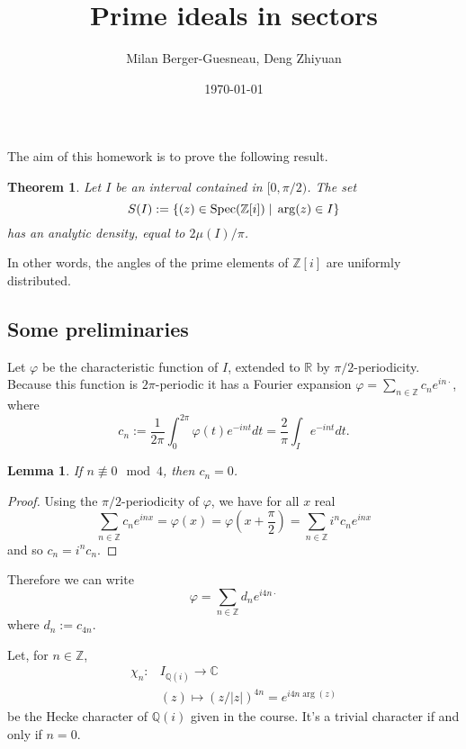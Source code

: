 \documentclass[12pt,a4paper,english]{article}
\title{Prime ideals in sectors}
\date{\today}
\author{Milan Berger-Guesneau, Deng Zhiyuan}
\theoremstyle{plain}
\newtheorem*{thm}{Theorem}
\newtheorem*{lem}{Lemma}
\theoremstyle{definition}
\DeclareMathOperator{\Spec}{\normalfont{Spec}}
\begin{document}
\maketitle

The aim of this homework is to prove the following result.

\begin{thm}
Let $I$ be an interval contained in $[0,\pi/2)$. The set
\begin{equation*}
    S(I):=\{(z)\in\Spec(\mathbb{Z}[i])\mid\, \arg(z)\in I\}
\end{equation*}
has an analytic density, equal to $2\mu(I)/\pi$.
\end{thm}
In other words, the angles of the prime elements of $\mathbb{Z}[i]$ are uniformly distributed.

\vspace{0.5cm}

\subsection*{Some preliminaries}

Let $\varphi$ be the characteristic function of $I$, extended to $\mathbb{R}$ by $\pi/2$-periodicity. Because this function is $2\pi$-periodic it has a Fourier expansion $\varphi=\sum_{n\in\mathbb{Z}}c_n e^{in\cdot}$, where 
\begin{equation*}
    c_n:=\frac{1}{2\pi}\int_0^{2\pi}\varphi(t)e^{-int}dt=\frac{2}{\pi}\int_I e^{-int}dt.
\end{equation*}

\begin{lem}
If $n\not\equiv 0\mod 4$, then $c_n=0$.
\end{lem}
\begin{proof}
Using the $\pi/2$-periodicity of $\varphi$, we have for all $x$ real
\begin{equation*}
    \sum_{n\in\mathbb{Z}}c_n e^{inx}=\varphi(x)=\varphi\left(x+\frac{\pi}{2}\right)=\sum_{n\in\mathbb{Z}}i^nc_n e^{inx}
\end{equation*}
and so $c_n=i^nc_n$. 
\end{proof}

Therefore we can write 
\begin{equation}\label{FourierPhi}
    \varphi=\sum_{n\in\mathbb{Z}}d_n e^{i4n\cdot}
\end{equation}
where $d_n:=c_{4n}$.
\vspace{0.5cm}

Let, for $n\in\mathbb{Z}$,
\begin{align*}
    \chi_n:&I_{\mathbb{Q}(i)}\longrightarrow\mathbb{C}\\
    &(z)\mapsto (z/|z|)^{4n}=e^{i4n\arg(z)}
\end{align*}
be the Hecke character of $\mathbb{Q}(i)$ given in the course. It's a trivial character if and only if $n=0$.
\vspace{0.5cm}
\end{document}
